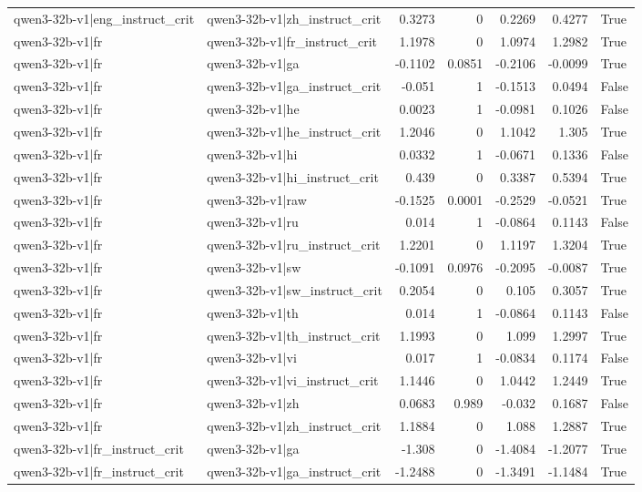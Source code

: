 \begin{table}
\begin{tabular}{l l r r r r l}
qwen3-32b-v1|eng_instruct_crit & qwen3-32b-v1|zh_instruct_crit & 0.3273 & 0 & 0.2269 & 0.4277 & True \\
qwen3-32b-v1|fr & qwen3-32b-v1|fr_instruct_crit & 1.1978 & 0 & 1.0974 & 1.2982 & True \\
qwen3-32b-v1|fr & qwen3-32b-v1|ga & -0.1102 & 0.0851 & -0.2106 & -0.0099 & True \\
qwen3-32b-v1|fr & qwen3-32b-v1|ga_instruct_crit & -0.051 & 1 & -0.1513 & 0.0494 & False \\
qwen3-32b-v1|fr & qwen3-32b-v1|he & 0.0023 & 1 & -0.0981 & 0.1026 & False \\
qwen3-32b-v1|fr & qwen3-32b-v1|he_instruct_crit & 1.2046 & 0 & 1.1042 & 1.305 & True \\
qwen3-32b-v1|fr & qwen3-32b-v1|hi & 0.0332 & 1 & -0.0671 & 0.1336 & False \\
qwen3-32b-v1|fr & qwen3-32b-v1|hi_instruct_crit & 0.439 & 0 & 0.3387 & 0.5394 & True \\
qwen3-32b-v1|fr & qwen3-32b-v1|raw & -0.1525 & 0.0001 & -0.2529 & -0.0521 & True \\
qwen3-32b-v1|fr & qwen3-32b-v1|ru & 0.014 & 1 & -0.0864 & 0.1143 & False \\
qwen3-32b-v1|fr & qwen3-32b-v1|ru_instruct_crit & 1.2201 & 0 & 1.1197 & 1.3204 & True \\
qwen3-32b-v1|fr & qwen3-32b-v1|sw & -0.1091 & 0.0976 & -0.2095 & -0.0087 & True \\
qwen3-32b-v1|fr & qwen3-32b-v1|sw_instruct_crit & 0.2054 & 0 & 0.105 & 0.3057 & True \\
qwen3-32b-v1|fr & qwen3-32b-v1|th & 0.014 & 1 & -0.0864 & 0.1143 & False \\
qwen3-32b-v1|fr & qwen3-32b-v1|th_instruct_crit & 1.1993 & 0 & 1.099 & 1.2997 & True \\
qwen3-32b-v1|fr & qwen3-32b-v1|vi & 0.017 & 1 & -0.0834 & 0.1174 & False \\
qwen3-32b-v1|fr & qwen3-32b-v1|vi_instruct_crit & 1.1446 & 0 & 1.0442 & 1.2449 & True \\
qwen3-32b-v1|fr & qwen3-32b-v1|zh & 0.0683 & 0.989 & -0.032 & 0.1687 & False \\
qwen3-32b-v1|fr & qwen3-32b-v1|zh_instruct_crit & 1.1884 & 0 & 1.088 & 1.2887 & True \\
qwen3-32b-v1|fr_instruct_crit & qwen3-32b-v1|ga & -1.308 & 0 & -1.4084 & -1.2077 & True \\
qwen3-32b-v1|fr_instruct_crit & qwen3-32b-v1|ga_instruct_crit & -1.2488 & 0 & -1.3491 & -1.1484 & True \\

\end{tabular}
\end{table}
